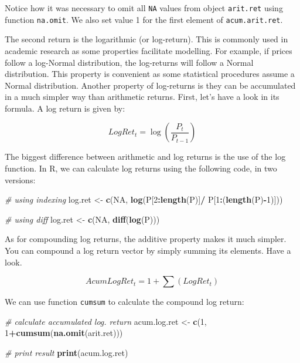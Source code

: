 \documentclass[11pt,]{book}
\newenvironment{Shaded}{\begin{snugshade}}{\end{snugshade}}
\newcommand{\KeywordTok}[1]{\textcolor[rgb]{0.27,0.27,0.27}{\textbf{#1}}}
\newcommand{\DecValTok}[1]{\textcolor[rgb]{0.06,0.06,0.06}{#1}}
\newcommand{\StringTok}[1]{\textcolor[rgb]{0.5,0.5,0.5}{#1}}
\newcommand{\CommentTok}[1]{\textcolor[rgb]{0.56,0.35,0.01}{\textit{#1}}}
\newcommand{\OtherTok}[1]{\textcolor[rgb]{0.56,0.35,0.01}{#1}}
\newcommand{\OperatorTok}[1]{\textcolor[rgb]{0.81,0.36,0.00}{\textbf{#1}}}
\newcommand{\NormalTok}[1]{#1}
\begin{document}
Notice how it was necessary to omit all \texttt{NA} values from object
\texttt{arit.ret} using function \texttt{na.omit}. We also set value 1
for the first element of \texttt{acum.arit.ret}.

The second return is the logarithmic (or log-return). This is commonly
used in academic research as some properties facilitate modelling. For
example, if prices follow a log-Normal distribution, the log-returns
will follow a Normal distribution. This property is convenient as some
statistical procedures assume a Normal distribution. Another property of
log-returns is they can be accumulated in a much simpler way than
arithmetic returns. First, let's have a look in its formula. A log
return is given by:

\[LogRet_t = \log\left ( \frac{P_t}{P_{t-1}} \right )\]

The biggest difference between arithmetic and log returns is the use of
the log function. In R, we can calculate log returns using the following
code, in two versions:

\begin{Shaded}
\begin{Highlighting}[]
\CommentTok{# using indexing}
\NormalTok{log.ret <-}\StringTok{ }\KeywordTok{c}\NormalTok{(}\OtherTok{NA}\NormalTok{, }\KeywordTok{log}\NormalTok{(P[}\DecValTok{2}\OperatorTok{:}\KeywordTok{length}\NormalTok{(P)]}\OperatorTok{/}
\StringTok{                     }\NormalTok{P[}\DecValTok{1}\OperatorTok{:}\NormalTok{(}\KeywordTok{length}\NormalTok{(P)}\OperatorTok{-}\DecValTok{1}\NormalTok{)]))}

\CommentTok{# using diff                     }
\NormalTok{log.ret <-}\StringTok{ }\KeywordTok{c}\NormalTok{(}\OtherTok{NA}\NormalTok{, }\KeywordTok{diff}\NormalTok{(}\KeywordTok{log}\NormalTok{(P)))                   }
\end{Highlighting}
\end{Shaded}

As for compounding log returns, the additive property makes it much
simpler. You can compound a log return vector by simply summing its
elements. Have a look.

\[AcumLogRet_t = 1+ \sum\left (LogRet _t \right ) \]

We can use function \texttt{cumsum} to calculate the compound log
return: 

\begin{Shaded}
\begin{Highlighting}[]
\CommentTok{# calculate accumulated log. return}
\NormalTok{acum.log.ret <-}\StringTok{ }\KeywordTok{c}\NormalTok{(}\DecValTok{1}\NormalTok{, }\DecValTok{1}\OperatorTok{+}\KeywordTok{cumsum}\NormalTok{(}\KeywordTok{na.omit}\NormalTok{(arit.ret)))}
                  
\CommentTok{# print result}
\KeywordTok{print}\NormalTok{(acum.log.ret)}
\end{Highlighting}
\end{Shaded}
\end{document}
